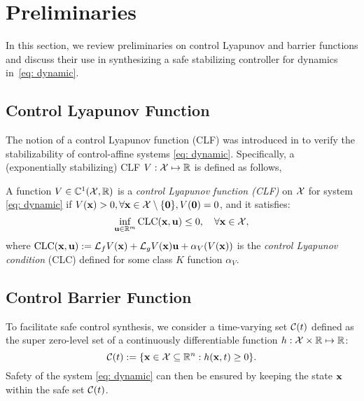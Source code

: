 \section{Preliminaries}
\label{sec: prelim}

In this section, we review preliminaries on control Lyapunov and barrier functions and discuss their use in synthesizing a safe stabilizing controller for dynamics in~\eqref{eq: dynamic}.

\subsection{Control Lyapunov Function}
The notion of a control Lyapunov function (CLF) was introduced in \cite{Artstein1983StabilizationWR, SONTAG1989117} to verify the stabilizability of control-affine systems \eqref{eq: dynamic}. Specifically, a (exponentially stabilizing) CLF $V: {\cal X} \mapsto \mathbb{R}$ is defined as follows,
%
\begin{definition}
A function $V \in \mathbb{C}^1({\cal X},\mathbb{R})$ is a \emph{control Lyapunov function (CLF)} on ${\cal X}$ for system \eqref{eq: dynamic} if $V(\mathbf{x})>0, \forall \mathbf{x} \in {\cal X} \setminus \{\boldsymbol{0} \}, V(\boldsymbol{0}) = 0$, and it satisfies:
%
\begin{equation}\label{eq: clf}
    \inf_{\mathbf{u} \in \mathbb{R}^m} \text{CLC}(\mathbf{x},\mathbf{u}) \leq 0, \quad \forall \mathbf{x} \in {\cal X},
\end{equation}
%
where $\text{CLC}(\mathbf{x},\mathbf{u}) := \mathcal{L}_f V(\mathbf{x}) + \mathcal{L}_g V(\mathbf{x})\mathbf{u} + \alpha_V( V(\mathbf{x}))$
is the \emph{control Lyapunov condition} (CLC) defined for some class $K$ function $\alpha_V$.
\end{definition}


\subsection{Control Barrier Function}

To facilitate safe control synthesis, we consider a time-varying set ${\cal C}(t)$ defined as the super zero-level set of a continuously differentiable function $h: {\cal X} \times \mathbb{R} \mapsto \mathbb{R}$:
%
\begin{equation}
\label{eq: safe_set}  
    {\cal C}(t) := \{\mathbf{x} \in {\cal X} \subseteq \mathbb{R}^n: h(\mathbf{x}, t) \geq 0 \}.
\end{equation}
%
Safety of the system \eqref{eq: dynamic} can then be ensured by keeping the state $\mathbf{x}$ within the safe set ${\cal C}(t)$.


